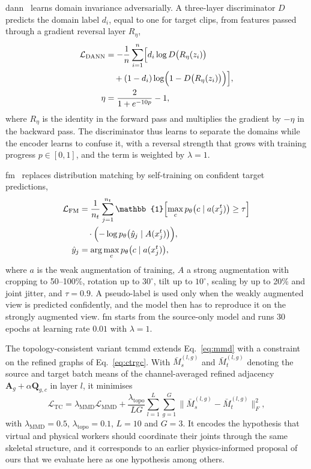 \documentclass[Afour,sagev,times]{sagej}
\begin{document}
\ac{dann}~\cite{ganin2016dann} learns domain invariance adversarially. A
three-layer discriminator $D$ predicts the domain label $d_i$, equal to one for
target clips, from features passed through a gradient reversal layer
$R_\eta$,
\begin{equation}
  \begin{aligned}
  \mathcal{L}_{\mathrm{DANN}}
    &=-\frac{1}{n}\sum_{i=1}^{n}
      \Bigl[d_i\log D\bigl(R_\eta(z_i)\bigr)\\
    &\quad +(1-d_i)\log\Bigl(1-D\bigl(R_\eta(z_i)\bigr)\Bigr)\Bigr],\\
  \eta&=\frac{2}{1+e^{-10p}}-1,
  \end{aligned}
  \label{eq:dann}
\end{equation}
where $R_\eta$ is the identity in the forward pass and multiplies the gradient
by $-\eta$ in the backward pass. The discriminator thus learns to separate the
domains while the encoder learns to confuse it, with a reversal strength that
grows with training progress $p\in[0,1]$, and the term is weighted by
$\lambda=1$.

\ac{fm}~\cite{sohn2020fixmatch} replaces distribution matching by
self-training on confident target predictions,
\begin{equation}
  \begin{aligned}
  \mathcal{L}_{\mathrm{FM}}
    &=\frac{1}{n_t}\sum_{j=1}^{n_t}
      \mathbb{1}\Bigl[\max_c p_\theta\bigl(c\mid a(x_j^t)\bigr)\ge\tau\Bigr]\\
    &\quad\cdot\Bigl(-\log p_\theta\bigl(\hat{y}_j\mid A(x_j^t)\bigr)\Bigr),\\
  \hat{y}_j&=\arg\max_c p_\theta\bigl(c\mid a(x_j^t)\bigr),
  \end{aligned}
  \label{eq:fm}
\end{equation}
where $a$ is the weak augmentation of training, $A$ a strong augmentation with
cropping to 50--100\%, rotation up to $30^\circ$, tilt up to $10^\circ$,
scaling by up to 20\% and joint jitter, and $\tau=0.9$. A pseudo-label is used
only when the weakly augmented view is predicted confidently, and the model
then has to reproduce it on the strongly augmented view. \ac{fm} starts from
the source-only model and runs 30 epochs at learning rate $0.01$ with
$\lambda=1$.

The topology-consistent variant \ac{tcmmd} extends Eq.~\ref{eq:mmd} with a
constraint on the refined graphs of Eq.~\ref{eq:ctrgc}. With
$\bar{M}^{(l,g)}_s$ and $\bar{M}^{(l,g)}_t$ denoting the source and target
batch means of the channel-averaged refined adjacency
$\mathbf{A}_g+\alpha\mathbf{Q}_{g,c}$ in layer $l$, it minimises
\begin{equation}
  \mathcal{L}_{\mathrm{TC}}=\lambda_{\mathrm{MMD}}\mathcal{L}_{\mathrm{MMD}}
  +\frac{\lambda_{\mathrm{topo}}}{LG}\sum_{l=1}^{L}\sum_{g=1}^{G}
  \bigl\|\bar{M}^{(l,g)}_s-\bar{M}^{(l,g)}_t\bigr\|_F^2,
  \label{eq:tc}
\end{equation}
with $\lambda_{\mathrm{MMD}}=0.5$, $\lambda_{\mathrm{topo}}=0.1$, $L=10$ and
$G=3$. It encodes the hypothesis that virtual and physical workers should
coordinate their joints through the same skeletal structure, and it corresponds
to an earlier physics-informed proposal of ours that we evaluate here as one
hypothesis among others.
\end{document}
